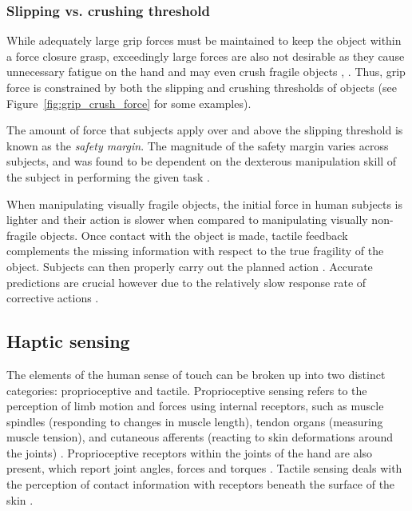 \subsubsection*{Slipping vs. crushing threshold}
While adequately large grip forces must be maintained to keep the object within a force closure grasp, exceedingly large forces are also not desirable as they cause unnecessary fatigue on the hand and may even crush fragile objects \cite{johansson1994grasp}, \cite{gorniak2010manipulation}.
Thus, grip force is constrained by both the slipping and crushing thresholds of objects (see Figure~\ref{fig:grip_crush_force} for some examples).

The amount of force that subjects apply over and above the slipping threshold is known as the \emph{safety margin}.
The magnitude of the safety margin varies across subjects, and was found to be dependent on the dexterous manipulation skill of the subject in performing the given task \cite{Johansson1984}.

When manipulating visually fragile objects, the initial force in human subjects is lighter and their action is slower when compared to manipulating visually non-fragile objects.
Once contact with the object is made, tactile feedback complements the missing information with respect to the true fragility of the object. 
Subjects can then properly carry out the planned action \cite{chinellato2008visual}.
Accurate predictions are crucial however due to the relatively slow response rate of corrective actions \cite{johansson2009coding}.


\subsection{Haptic sensing}
\label{touch_sensing}
The elements of the human sense of touch can be broken up into two distinct categories: proprioceptive and tactile.
Proprioceptive sensing refers to the perception of limb motion and forces using internal receptors, such as muscle spindles (responding to changes in muscle length), tendon organs (measuring muscle tension), and cutaneous afferents (reacting to skin deformations around the joints) \cite{johansson2009coding}.
Proprioceptive receptors within the joints of the hand are also present, which report joint angles, forces and torques \cite{howe1993tactile}.
Tactile sensing deals with the perception of contact information with receptors beneath the surface of the skin \cite{vallbo1984properties}.

